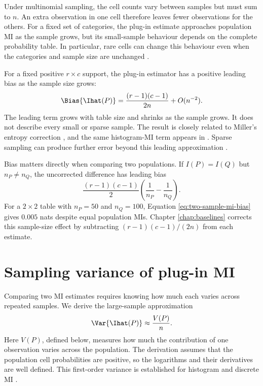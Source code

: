 Under multinomial sampling, the cell counts vary between samples but must
sum to \(n\). An extra observation in one cell therefore leaves fewer
observations for the others. For a fixed set of categories, the plug-in
estimate approaches population MI as the sample grows, but its small-sample
behaviour depends on the complete probability table. In particular, rare
cells can change this behaviour even when the categories and sample size are
unchanged
\citep{paninski2003}.

For a fixed positive \(r\times c\) support, the plug-in estimator has a
positive leading bias as the sample size grows:
\begin{equation}
  \Bias\{\Ihat(P)\}
  =\frac{(r-1)(c-1)}{2n}+O(n^{-2}).
  \label{eq:mi-leading-bias}
\end{equation}
The leading term grows with table size and shrinks as the sample grows. It
does not describe every small or sparse sample. The result is closely related
to Miller's entropy correction \citep{miller1955}, and the same histogram-MI
term appears in \citet{moddemeijer1989}. Sparse sampling can produce further
error beyond this leading approximation \citep{paninski2003}.

Bias matters directly when comparing two populations. If
\(I(P)=I(Q)\) but \(n_P\ne n_Q\), the uncorrected difference has leading bias
\begin{equation}
  \frac{(r-1)(c-1)}{2}
  \left(\frac{1}{n_P}-\frac{1}{n_Q}\right).
  \label{eq:two-sample-mi-bias}
\end{equation}
For a \(2\times2\) table with \(n_P=50\) and \(n_Q=100\), Equation
\eqref{eq:two-sample-mi-bias} gives \(0.005\) nats despite equal population MIs. Chapter
\ref{chap:baselines} corrects this sample-size effect by subtracting
\((r-1)(c-1)/(2n)\) from each estimate.

\section{Sampling variance of plug-in MI}
\label{sec:first-order-mi-background}

Comparing two MI estimates requires knowing how much each varies across
repeated samples. We derive the large-sample approximation
\begin{equation}
  \Var\{\Ihat(P)\}\approx\frac{V(P)}{n}.
  \label{eq:first-order-mi-var-background}
\end{equation}
Here \(V(P)\), defined below, measures how much the contribution of one
observation varies across the population. The derivation assumes that the
population cell probabilities are positive, so the logarithms and their
derivatives are well defined. This first-order variance is established for
histogram and discrete MI \citep{moddemeijer1989,brillinger2004}.

